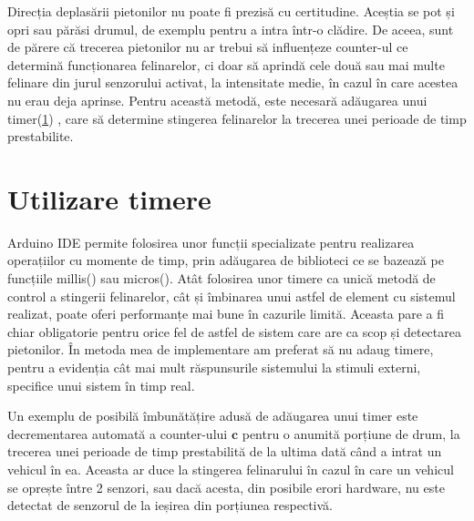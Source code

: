 Direcția deplasării pietonilor nu poate fi prezisă cu certitudine. Aceștia se pot și opri sau părăsi drumul, de exemplu pentru a intra într-o clădire. De aceea, sunt de părere că trecerea pietonilor nu ar trebui să influențeze counter-ul ce determină funcționarea felinarelor, ci doar să aprindă cele două sau mai multe felinare din jurul senzorului activat, la intensitate medie, în cazul în care acestea nu erau deja aprinse. Pentru această metodă, este necesară adăugarea unui timer(\ref{timer}) , care să determine stingerea felinarelor la trecerea unei perioade de timp prestabilite.

\section{Utilizare timere} \label{timer}

Arduino IDE permite folosirea unor funcții specializate pentru realizarea operațiilor cu momente de timp, prin adăugarea de biblioteci ce se bazează pe funcțiile millis() sau micros(). Atât folosirea unor timere ca unică metodă de control a stingerii felinarelor, cât și îmbinarea unui astfel de element cu sistemul realizat, poate oferi performanțe mai bune în cazurile limită. Aceasta pare a fi chiar obligatorie pentru orice fel de astfel de sistem care are ca scop și detectarea pietonilor. În metoda mea de implementare am preferat să nu adaug timere, pentru a evidenția cât mai mult răspunsurile sistemului la stimuli externi, specifice unui sistem în timp real. 

Un exemplu de posibilă îmbunătățire adusă de adăugarea unui timer este decrementarea automată a counter-ului $\mathbf{c}$ pentru o anumită porțiune de drum, la trecerea unei perioade de timp prestabilită de la ultima dată când a intrat un vehicul în ea. Aceasta ar duce la stingerea felinarului în cazul în care un vehicul se oprește între 2 senzori, sau dacă acesta, din posibile erori hardware, nu este detectat de senzorul de la ieșirea din porțiunea respectivă. 
